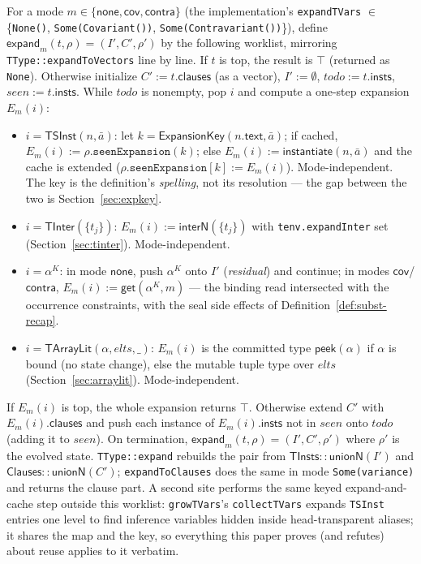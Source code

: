 \documentclass[11pt]{article}
\newcommand{\TInsts}{\mathsf{TInsts}}
\newcommand{\Clauses}{\mathsf{Clauses}}
\newcommand{\expandop}{\mathsf{expand}}
\newcommand{\instop}{\mathsf{instantiate}}
\newcommand{\Cov}{\mathsf{cov}}
\newcommand{\Contra}{\mathsf{contra}}
\newcommand{\NoneM}{\mathsf{none}}
\newcommand{\getop}{\mathsf{get}}
\begin{document}
\begin{definition}[Expansion]
\label{def:expand}
For a mode $m \in \{\NoneM, \Cov, \Contra\}$ (the implementation's
\texttt{expandTVars} $\in$
\{\texttt{None()}, \texttt{Some(Covariant())},
\texttt{Some(Contravariant())}\}), define
$\expandop_m(t, \rho) = (I', C', \rho')$ by the following worklist,
mirroring \texttt{TType::expandToVectors} line by line. If
$t$ is top, the result is $\top$ (returned as \texttt{None}). Otherwise
initialize $C' := t.\mathsf{clauses}$ (as a vector), $I' := \emptyset$,
$\mathit{todo} := t.\mathsf{insts}$, $\mathit{seen} := t.\mathsf{insts}$.
While $\mathit{todo}$ is nonempty, pop $i$ and compute a one-step
expansion $E_m(i)$:
\begin{itemize}
\item $i = \mathsf{TSInst}(n,\bar{a})$: let
  $k = \mathsf{ExpansionKey}(n.\mathsf{text}, \bar{a})$; if cached,
  $E_m(i) := \rho.\texttt{seenExpansion}(k)$; else
  $E_m(i) := \instop(n, \bar{a})$ and the cache is extended
  ($\rho.\texttt{seenExpansion}[k] := E_m(i)$). Mode-independent. The
  key is the definition's \emph{spelling}, not its resolution — the gap
  between the two is Section~\ref{sec:expkey}.
\item $i = \mathsf{TInter}(\{t_j\})$: $E_m(i) :=
  \mathsf{interN}(\{t_j\})$ with \texttt{tenv.expandInter} set
  (Section~\ref{sec:tinter}). Mode-independent.
\item $i = \alpha^K$: in mode $\NoneM$, push $\alpha^K$ onto $I'$
  (\emph{residual}) and continue; in modes $\Cov$/$\Contra$,
  $E_m(i) := \getop(\alpha^K, m)$ — the binding read intersected with the
  occurrence constraints, with the seal side effects of
  Definition~\ref{def:subst-recap}.
\item $i = \mathsf{TArrayLit}(\alpha, \mathit{elts}, \_)$: $E_m(i)$ is
  the committed type $\mathsf{peek}(\alpha)$ if $\alpha$ is bound
  (no state change), else the mutable tuple type over $\mathit{elts}$
  (Section~\ref{sec:arraylit}). Mode-independent.
\end{itemize}
If $E_m(i)$ is top, the whole expansion returns $\top$. Otherwise extend
$C'$ with $E_m(i).\mathsf{clauses}$ and push each instance of
$E_m(i).\mathsf{insts}$ not in $\mathit{seen}$ onto $\mathit{todo}$
(adding it to $\mathit{seen}$). On termination,
$\expandop_m(t,\rho) = (I', C', \rho')$ where $\rho'$ is the evolved
state. \texttt{TType::expand} rebuilds the pair from
$\TInsts{::}\mathsf{unionN}(I')$ and
$\Clauses{::}\mathsf{unionN}(C')$;
\texttt{expandToClauses} does the same in mode
\texttt{Some(variance)} and returns the clause part. A second site
performs the same keyed expand-and-cache step outside this worklist:
\texttt{growTVars}'s \texttt{collectTVars} expands \texttt{TSInst}
entries one level to find inference variables hidden inside
head-transparent aliases; it shares the map and the key, so everything
this paper proves (and refutes) about reuse applies to it verbatim.
\end{definition}
\end{document}
